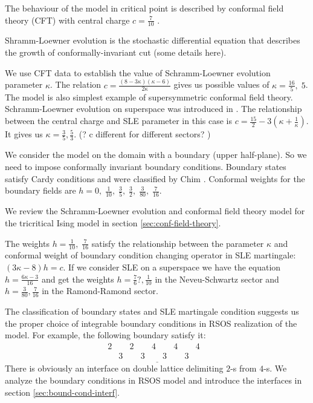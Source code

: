 \documentclass[12pt]{article}
\begin{document}
The behaviour of the model in critical
point is described by conformal field theory (CFT) with central charge $c=\frac{7}{10}$
\cite{friedan1985superconformal}. 

Shramm-Loewner evolution is the stochastic differential equation that describes the growth of
conformally-invariant cut (some details here).

We use CFT data to establish the value of Schramm-Loewner evolution parameter $\kappa$. The relation
$c=\frac{(8-3\kappa)(\kappa-6)}{2\kappa}$ gives us possible values of $\kappa=\frac{16}{5},\; 5$.
The model is also simplest example of supersymmetric conformal field theory. Schramm-Loewner
evolution on superspace was introduced in \cite{nagi2005stochastic,rasmussen2004stochastic}. The
relationship between the central charge and SLE parameter in this case is
$c=\frac{15}{2}-3\left(\kappa+\frac{1}{\kappa}\right)$. It gives us
$\kappa=\frac{3}{5},\frac{5}{3}$. (? c different for different sectors? )

We consider the model on the domain with a boundary (upper half-plane). So we need to impose
conformally invariant boundary conditions. Boundary states satisfy Cardy conditions and were
classified by Chim \cite{chim1996boundary}. Conformal weights for the boundary fields are $h=0,\;
\frac{1}{10},\; \frac{3}{5},\; \frac{3}{2},\; \frac{3}{80},\; \frac{7}{16}$.

We review the Schramm-Loewner evolution and conformal field theory model for the tricritical Ising
model in section \ref{sec:conf-field-theory}. 

The weights $h=\frac{1}{10},\; \frac{7}{16}$ satisfy the relationship between the parameter $\kappa$
and conformal weight of boundary condition changing operator in SLE martingale: $(3\kappa-8) h =c$.
If we consider SLE on a superspace we have the equation $h=\frac{6\kappa-3}{16}$ and get the weights
$h=\frac{7}{6}?, \frac{1}{10}$ in the Neveu-Schwartz sector and $h=\frac{3}{80}, \frac{7}{16}$ in
the Ramond-Ramond sector.

The classification of boundary states and SLE martingale condition suggests us the proper choice of
integrable boundary conditions in RSOS realization of the model. For example, the following boundary
satisfy it:
\begin{equation}
  \label{eq:2}
  \underline{\begin{array}{llllllllll}
    2 & & 2 & & 4 & & 4 & & 4\\
    &  3 & & 3 & & 3 & & 3 & &
  \end{array}}
\end{equation}
There is obviously an interface on double lattice delimiting $2$-s from $4$-s. We analyze the
boundary conditions in RSOS model and  introduce the interfaces in section
\ref{sec:bound-cond-interf}. 
\end{document}
